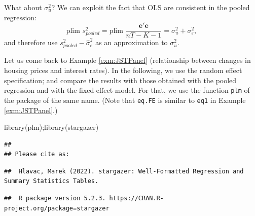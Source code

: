 \documentclass[
  12pt,
]{book}
\newenvironment{Shaded}{\begin{snugshade}}{\end{snugshade}}
\newcommand{\FunctionTok}[1]{\textcolor[rgb]{0.00,0.00,0.00}{#1}}
\newcommand{\NormalTok}[1]{#1}
\theoremstyle{definition}
\theoremstyle{definition}
\theoremstyle{definition}
\theoremstyle{definition}
\theoremstyle{remark}
\begin{document}
What about \(\sigma_u^2\)? We can exploit the fact that OLS are consistent in the pooled regression:
\[
\mbox{plim }s^2_{pooled} = \mbox{plim }\frac{\mathbf{e}'\mathbf{e}}{nT-K-1} = \sigma_u^2 + \sigma_\varepsilon^2,
\]
and therefore use \(s^2_{pooled} - \hat{\sigma}_e^2\) as an approximation to \(\sigma_u^2\).

Let us come back to Example \ref{exm:JSTPanel} (relationship between changes in housing prices and interest rates). In the following, we use the random effect specification; and compare the results with those obtained with the pooled regression and with the fixed-effect model. For that, we use the function \texttt{plm} of the package of the same name. (Note that \texttt{eq.FE} is similar to \texttt{eq1} in Example \ref{exm:JSTPanel}.)

\begin{Shaded}
\begin{Highlighting}[]
\FunctionTok{library}\NormalTok{(plm);}\FunctionTok{library}\NormalTok{(stargazer)}
\end{Highlighting}
\end{Shaded}

\begin{verbatim}
## 
## Please cite as:
\end{verbatim}

\begin{verbatim}
##  Hlavac, Marek (2022). stargazer: Well-Formatted Regression and Summary Statistics Tables.
\end{verbatim}

\begin{verbatim}
##  R package version 5.2.3. https://CRAN.R-project.org/package=stargazer
\end{verbatim}
\end{document}
